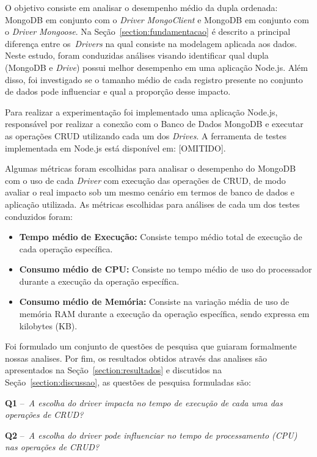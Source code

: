 \documentclass[12pt]{article}
\begin{document}
O objetivo consiste em analisar o desempenho médio da dupla ordenada: MongoDB em conjunto com o \emph{Driver} \emph{MongoClient} e MongoDB em conjunto com o \emph{Driver} \emph{Mongoose}. Na Seção~\ref{section:fundamentacao} é descrito a principal diferença entre os~\emph{Drivers} na qual consiste na modelagem aplicada aos dados. Neste estudo, foram conduzidas análises visando identificar qual dupla (MongoDB e \emph{Drive}) possui melhor desempenho em uma aplicação Node.js. Além disso, foi investigado se o tamanho médio de cada registro presente no conjunto de dados pode influenciar e qual a proporção desse impacto.

Para realizar a experimentação foi implementado uma aplicação Node.js, responsável por realizar a conexão com o Banco de Dados MongoDB e executar as operações CRUD utilizando cada um dos \emph{Drives}. A ferramenta de testes implementada em Node.js está disponível em: [OMITIDO].%

Algumas métricas foram escolhidas para analisar o desempenho do MongoDB com o uso de cada \emph{Driver} com execução das operações de CRUD, de modo avaliar o real impacto sob um mesmo cenário em termos de banco de dados e aplicação utilizada. As métricas escolhidas para análises de cada um dos testes conduzidos foram:

\begin{itemize}
\item \textbf{Tempo médio de Execução:} Consiste tempo médio total de execução de cada operação específica.
\item \textbf{Consumo médio de CPU:} Consiste no tempo médio de uso do processador durante a execução da operação específica.
\item \textbf{Consumo médio de Memória:} Consiste na variação média de uso de memória RAM durante a execução da operação específica, sendo expressa em kilobytes (KB).
\end{itemize}

Foi formulado um conjunto de questões de pesquisa que guiaram formalmente nossas analises. Por fim, os resultados obtidos através das analises são apresentados na Seção~\ref{section:resultados} e discutidos na Seção~\ref{section:discussao}, as questões de pesquisa formuladas são:

\textbf{Q1} --~\emph{A escolha do driver impacta no tempo de execução de cada uma das operações de CRUD?}


\textbf{Q2} --~\emph{A escolha do driver pode influenciar no tempo de processamento (CPU) nas operações de CRUD?}
\end{document}
